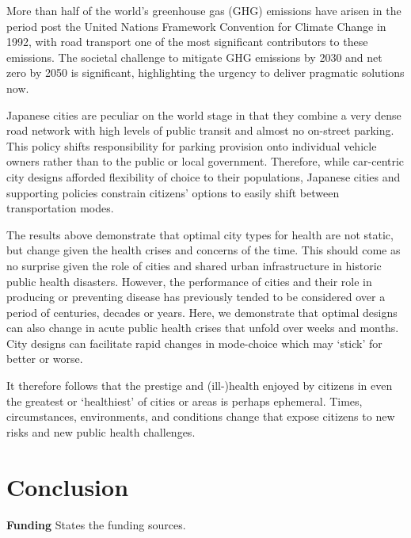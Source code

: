 \documentclass[preprint,12pt]{elsarticle}
\begin{document}
More than half of the world's greenhouse gas (GHG) emissions have arisen in the period post the United Nations Framework Convention for Climate Change in 1992\cite{bashmakov2022climate}, with road transport one of the most significant contributors to these emissions. The societal challenge to mitigate GHG emissions by 2030 and net zero by 2050\cite{lynskey2020moving} is significant, highlighting the urgency to deliver pragmatic solutions now.

Japanese cities are peculiar on the world stage in that they combine a very dense road network with high levels of public transit and almost no on-street parking. This policy shifts responsibility for parking provision onto individual vehicle owners rather than to the public or local government. Therefore, while car-centric city designs afforded flexibility of choice to their populations, Japanese cities and supporting policies constrain citizens' options to easily shift between transportation modes.

The results above demonstrate that optimal city types for health are not static, but change given the health crises and concerns of the time. This should come as no surprise given the role of cities and shared urban infrastructure in historic public health disasters. However, the performance of cities and their role in producing or preventing disease has previously tended to be considered over a period of centuries, decades or years. Here, we demonstrate that optimal designs can also change in acute public health crises that unfold over weeks and months. City designs can facilitate rapid changes in mode-choice which may `stick' for better or worse. 

It therefore follows that the prestige and (ill-)health enjoyed by citizens in even the greatest or `healthiest' of cities or areas is perhaps ephemeral. Times, circumstances, environments, and conditions change that expose citizens to new risks and new public health challenges.


\section*{Conclusion}

\textbf{Funding} States the funding sources.
\end{document}

